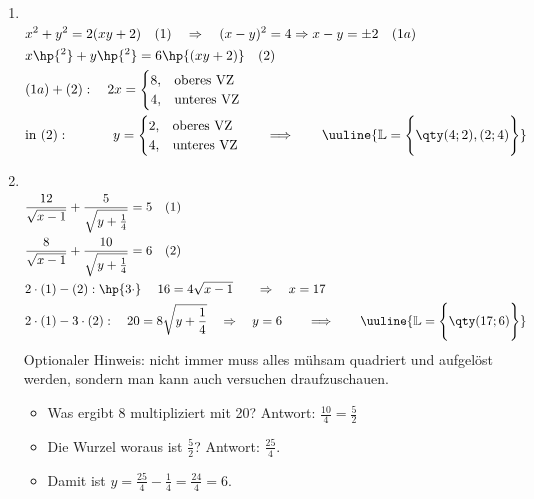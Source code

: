 \begin{enumerate}[label=(\alph*)]
    \item $~$\\[-1.45 cm]
    \begin{align*}
        &x^2+y^2=2(xy+2) \quad(1) \quad \Rightarrow \quad (x-y)^2 = 4 \Rightarrow x-y = \pm 2 \quad (1a)\\
        &x\hp{^2}+y\hp{^2} =6 \hp{(xy+2)} \quad(2)\\
        &(1a)+(2): \quad 2x = \begin{cases}
            8, & \text{oberes VZ} \\
            4, & \text{unteres VZ}
        \end{cases}\\
        &\text{in }(2): \qquad\quad\; y = \begin{cases}
            2, & \text{oberes VZ} \\
            4, & \text{unteres VZ}
        \end{cases} \qquad \Longrightarrow \qquad \uuline{\mathbb{L} = \Bigg\{\qty(4;2),(2;4)\Bigg\}}
    \end{align*}
    \item $~$\\[-1.45cm]
    \begin{align*}
        &\frac{12}{\sqrt{x-1}}+\frac{5}{\sqrt{y+\frac{1}{4}}}=5\quad (1)\\ 
        &\frac{8}{\sqrt{x-1}}+\frac{10}{\sqrt{y+\frac{1}{4}}}=6\quad(2)\\
        &2\cdot(1)-(2):\hp{3\cdot}\; \quad 16 = 4\sqrt{x-1}\;\;\; \quad \Rightarrow \quad x=17 \\
        &2\cdot(1)-3\cdot(2): \quad 20 = 8\sqrt{y+\frac{1}{4}} \quad \Rightarrow \quad y=6 \qquad \Longrightarrow \qquad \uuline{\mathbb{L} = \Bigg\{\qty(17;6)\Bigg\}}
    \end{align*} 
    Optionaler Hinweis: nicht immer muss alles mühsam quadriert und aufgelöst werden, sondern man kann auch versuchen draufzuschauen. 
    \begin{itemize}
        \item Was ergibt 8 multipliziert mit 20? Antwort: $\textstyle\frac{10}{4}=\frac{5}{2}$
        \item Die Wurzel woraus ist $\textstyle\frac{5}{2}$? Antwort: $\textstyle\frac{25}{4}$. 
        \item Damit ist $y = \frac{25}{4}-\frac{1}{4}= \frac{24}{4} = 6$.
    \end{itemize}
    \vspace{3mm}

\end{enumerate}
